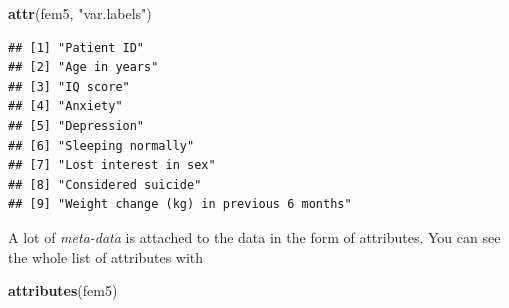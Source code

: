 \documentclass[
]{book}
\newenvironment{Shaded}{\begin{snugshade}}{\end{snugshade}}
\newcommand{\FunctionTok}[1]{\textcolor[rgb]{0.13,0.29,0.53}{\textbf{#1}}}
\newcommand{\NormalTok}[1]{#1}
\newcommand{\StringTok}[1]{\textcolor[rgb]{0.31,0.60,0.02}{#1}}
\begin{document}
\begin{Shaded}
\begin{Highlighting}[]
\FunctionTok{attr}\NormalTok{(fem5, }\StringTok{"var.labels"}\NormalTok{)}
\end{Highlighting}
\end{Shaded}

\begin{verbatim}
## [1] "Patient ID"                             
## [2] "Age in years"                           
## [3] "IQ score"                               
## [4] "Anxiety"                                
## [5] "Depression"                             
## [6] "Sleeping normally"                      
## [7] "Lost interest in sex"                   
## [8] "Considered suicide"                     
## [9] "Weight change (kg) in previous 6 months"
\end{verbatim}

A lot of \emph{meta-data} is attached to the data in the form of
attributes. You can see the whole list of attributes with

\begin{Shaded}
\begin{Highlighting}[]
\FunctionTok{attributes}\NormalTok{(fem5)}
\end{Highlighting}
\end{Shaded}
\end{document}
